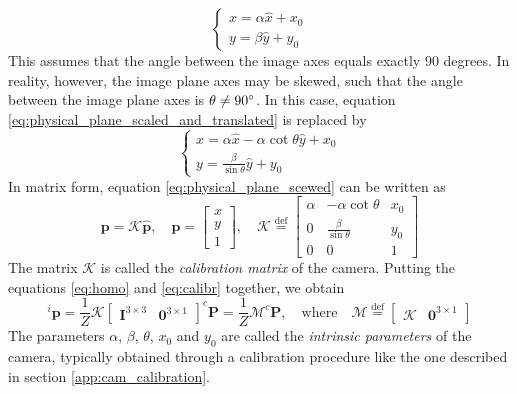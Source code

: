 \begin{equation}
\label{eq:physical_plane_scaled_and_translated}
    \begin{cases}
    x=\alpha\hat{x}+x_0\\
    y=\beta\hat{y}+y_0
    \end{cases}
\end{equation}
This assumes that the angle between the image axes equals exactly 90 degrees. In reality, however, the image plane axes may be skewed, such that the angle between the image plane axes is $\theta\neq90\degree$. In this case, equation \ref{eq:physical_plane_scaled_and_translated} is replaced by
\begin{equation}
\label{eq:physical_plane_scewed}
    \begin{cases}
    x=\alpha\hat{x}-\alpha\cot{\theta}\hat{y}+x_0\\
    y=\frac{\beta}{\sin{\theta}}\hat{y}+y_0
    \end{cases}
\end{equation}
In matrix form, equation \ref{eq:physical_plane_scewed} can be written as
\begin{equation}
\label{eq:calibr}
    \mathbf{p}=\mathcal{K}\mathbf{\hat{p}}, \quad \mathbf{p}=\begin{bmatrix}x\\y\\1\end{bmatrix},\quad \mathcal{K}\overset{\text{def}}{=}\begin{bmatrix}\alpha & -\alpha\cot{\theta} & x_0\\0 & \frac{\beta}{\sin{\theta}} & y_0\\0 & 0 & 1\end{bmatrix}
\end{equation}
The matrix $\mathcal{K}$ is called the \textit{calibration matrix} of the camera. Putting the equations \ref{eq:homo} and \ref{eq:calibr} together, we obtain
\begin{equation}
\label{eq:intrinsics}
    ^i\mathbf{p}=\frac{1}{Z}\mathcal{K}\begin{bmatrix}\mathbf{I}^{3\times3} & \mathbf{0}^{3\times1}\end{bmatrix}^c\mathbf{P}=\frac{1}{Z}\mathcal{M}^c\mathbf{P},\quad \text{where}\quad \mathcal{M}\overset{\text{def}}{=}\begin{bmatrix}\mathcal{K} & \mathbf{0}^{3\times1}\end{bmatrix}
\end{equation}
The parameters $\alpha$, $\beta$, $\theta$, $x_0$ and $y_0$ are called the \textit{intrinsic parameters} of the camera, typically obtained through a calibration procedure like the one described in section \ref{app:cam_calibration}.
